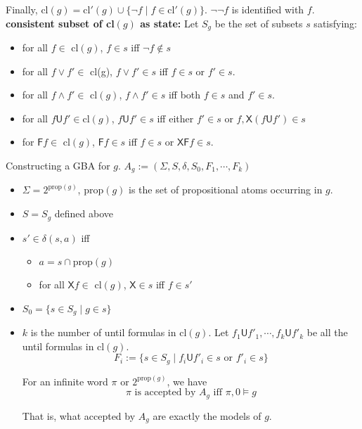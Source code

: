 \documentclass[12pt]{article}
\begin{document}
\begin{CJK*}{GBK}{song}
Finally, cl$(g)=$cl$'(g)\cup \{\neg f\mid f\in\mbox{cl}'(g)\}$.  $\neg\neg f$ is identified with $f$. \\

\noindent
{\bf consistent subset of cl$(g)$ as state:} Let $S_g$ be the set of subsets $s$ satisfying:
\begin{itemize}
\item for all $f\in$ cl$(g)$, $f\in s$ iff $\neg f\not\in s$
\item for all $f\vee f'\in $ cl(g), $f\vee f'\in s$ iff $f\in s$ or $f'\in s$.
\item for all $f\wedge f'\in$ cl$(g)$, $f\wedge f'\in s$ iff both $f\in s$ and $f'\in s$.
\item for all $f\textsf{U} f'\in\mbox{cl}(g)$, $f\textsf{U} f'\in s$ iff either $f'\in s$ or $f, \textsf{X}(f\textsf{U}f')\in s$
\item for $\textsf{F}f\in$ cl$(g)$, $\textsf{F}f\in s$ iff $f\in s$ or  $\textsf{X}\textsf{F}f\in s$.
\end{itemize}

Constructing a GBA for $g$.
$A_g:=(\Sigma, S, \delta, S_0, F_1,\cdots, F_k)$

\begin{itemize}
\item $\Sigma=2^{\text{prop}(g)}$, prop$(g)$ is the set of propositional atoms occurring in $g$.
\item $S=S_g$ defined above
\item $s'\in \delta(s,a)$ iff
  \begin{itemize}
  \item $a=s\cap \mbox{prop}(g)$
  \item for all $\textsf{X} f\in$ cl$(g)$, $\textsf{X}\in s$ iff $f\in s'$
  \end{itemize}
\item $S_0=\{s\in S_g\mid g\in s\}$

\item $k$ is the number of until formulas in cl$(g)$. Let $f_1\textsf{U} f'_1,\cdots, f_k\textsf{U} f'_k$ be all the until formulas in cl$(g)$.
$$F_i:=\{ s\in S_g\mid f_i\textsf{U}f'_i\in s \mbox{ or } f'_i\in s \}$$

For an infinite word $\pi$ or $2^{\text{prop}(g)}$, we have
%
$$\pi \mbox{ is accepted by $A_g$ iff }\pi,0\models g$$

That is, what accepted by $A_g$ are exactly the models of $g$.
\end{itemize}





\end{CJK*}
\end{document}
